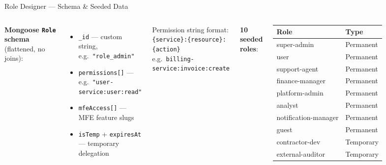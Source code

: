 \documentclass[aspectratio=169]{beamer}
\begin{document}
\begin{frame}{Role Designer --- Schema \& Seeded Data}
  \begin{columns}[t]
    \textbf{Mongoose \texttt{Role} schema} (flattened, no joins):
    \begin{itemize}
      \item \texttt{\_id} --- custom string, e.g.\ \texttt{"role\_admin"}
      \item \texttt{permissions[]} --- e.g.\ \texttt{"user-service:user:read"}
      \item \texttt{mfeAccess[]} --- MFE feature slugs
      \item \texttt{isTemp} + \texttt{expiresAt} --- temporary delegation
    \end{itemize}
    \vspace{0.3cm}
    Permission string format:\\
    \texttt{\{service\}:\{resource\}:\{action\}}\\[4pt]
    e.g.\ \texttt{billing-service:invoice:create}

    \textbf{10 seeded roles}:
    \medskip

    \begin{tabular}{@{}ll@{}}
      \toprule
      \small\textbf{Role} & \small\textbf{Type} \\
      \midrule
      \small super-admin         & Permanent \\
      \small user                & Permanent \\
      \small support-agent       & Permanent \\
      \small finance-manager     & Permanent \\
      \small platform-admin      & Permanent \\
      \small analyst             & Permanent \\
      \small notification-manager & Permanent \\
      \small guest               & Permanent \\
      \small contractor-dev      & \textcolor{HighlightAmber}{Temporary} \\
      \small external-auditor    & \textcolor{HighlightAmber}{Temporary} \\
      \bottomrule
    \end{tabular}
  \end{columns}
\end{frame}
\end{document}
